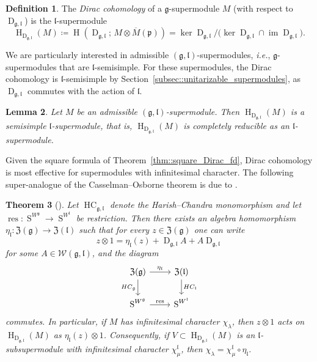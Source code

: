 \documentclass[11pt]{amsart}
\renewcommand{\Im}{\operatorname{im}}
\newcommand{\Dirac}{\operatorname{D}}
\def\WW{{\mathcal{W}}}
\def\pp{{\mathfrak p}}
\def\ZG{{\mathfrak{Z}(\gg)}}
\def\HC{{\operatorname{HC}}}
\def\H{{\operatorname{H}}}
\def\ll{{\mathfrak l}}
\def\pp{{\mathfrak p}}
\def\pp{{\mathfrak{p}}}
\def\gg{{\mathfrak{g}}}
\newcommand{\res}{\operatorname{res}}
\theoremstyle{plain}
\newtheorem{theorem}{Theorem}
\newtheorem{lemma}[theorem]{Lemma}
\theoremstyle{remark}
\theoremstyle{definition}
\newtheorem{definition}[theorem]{Definition}
\numberwithin{equation}{section}
\theoremstyle{remark}
\begin{document}
\begin{definition}\label{def::Dirac_cohom}
The \emph{Dirac cohomology} of a $\gg$-supermodule $M$ (with respect to $\Dirac_{\gg,\ll}$) is the $\ll$-supermodule
\[
\H_{\Dirac_{\gg,\ll}}(M)\coloneqq \H(\Dirac_{\gg,\ll};\, M\otimes \overline{M}(\pp))
=\ker \Dirac_{\gg,\ll}\big/\bigl(\ker \Dirac_{\gg,\ll}\cap \Im \Dirac_{\gg,\ll}\bigr).
\]
\end{definition}

We are particularly interested in admissible $(\gg, \ll)$-supermodules, \emph{i.e.}, $\gg$-supermodules that are $\ll$-semisimple. For these supermodules, the Dirac cohomology is $\ll$-semisimple by Section~\ref{subsec::unitarizable_supermodules}, as $\Dirac_{\gg,\ll}$ commutes with the action of $\ll$.

\begin{lemma} \label{lemm::completely_reducible_DC}
 Let $M$ be an admissible $(\gg, \ll)$-supermodule. Then $\H_{\Dirac_{\gg,\ll}}(M)$ is a semisimple $\ll$-supermodule, that is, $\H_{\Dirac_{\gg,\ll}}(M)$ is completely reducible as an $\ll$-supermodule.
\end{lemma}

Given the square formula of Theorem~\ref{thm::square_Dirac_fd}, Dirac cohomology is most effective for supermodules with
infinitesimal character. The following super-analogue of the Casselman--Osborne theorem is due to \cite{Schmidt_Noja}.

\begin{theorem}[\cite{Schmidt_Noja}] \label{thm::Casselman_Osborne} 
Let $\HC_{\gg,\ll}$ denote the Harish--Chandra monomorphism and let
$\res:\operatorname{S}^{W^{\gg}}\to \operatorname{S}^{W^{\ll}}$ be restriction. Then there exists an algebra homomorphism
$\eta_{\ll}:\ZG\to \mathfrak Z(\ll)$ such that for every $z\in\ZG$ one can write
\begin{equation}
 z\otimes 1=\eta_{\ll}(z)+\Dirac_{\gg,\ll}\!A+A\!\Dirac_{\gg,\ll}
\end{equation}
for some $A\in\WW(\gg,\ll)$, and the diagram
\[
\begin{tikzcd}
\ZG \arrow{r}{\eta_{\ll}} \arrow[swap]{d}{HC_{\gg}} & \mathfrak{Z}(\ll) \arrow{d}{HC_{\ll}} \\%
\operatorname{S}^{W^{\gg}} \arrow{r}{\res}& \operatorname{S}^{W^{\ll}}
\end{tikzcd}
\]
commutes. In particular, if $M$ has infinitesimal character $\chi_{\lambda}$, then $z\otimes 1$ acts on $\H_{\Dirac_{\gg,\ll}}(M)$ as
$\eta_{\ll}(z)\otimes 1$. Consequently, if $V\subset \H_{\Dirac_{\gg,\ll}}(M)$ is an $\ll$-subsupermodule with infinitesimal character
$\chi^{\ll}_{\mu}$, then $\chi_{\lambda}=\chi^{\ll}_{\mu}\circ \eta_{\ll}$.
\end{theorem}
\end{document}
